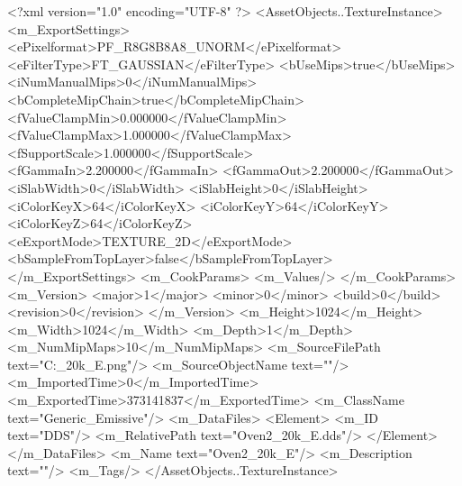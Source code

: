 <?xml version="1.0" encoding="UTF-8" ?>
<AssetObjects..TextureInstance>
	<m_ExportSettings>
		<ePixelformat>PF_R8G8B8A8_UNORM</ePixelformat>
		<eFilterType>FT_GAUSSIAN</eFilterType>
		<bUseMips>true</bUseMips>
		<iNumManualMips>0</iNumManualMips>
		<bCompleteMipChain>true</bCompleteMipChain>
		<fValueClampMin>0.000000</fValueClampMin>
		<fValueClampMax>1.000000</fValueClampMax>
		<fSupportScale>1.000000</fSupportScale>
		<fGammaIn>2.200000</fGammaIn>
		<fGammaOut>2.200000</fGammaOut>
		<iSlabWidth>0</iSlabWidth>
		<iSlabHeight>0</iSlabHeight>
		<iColorKeyX>64</iColorKeyX>
		<iColorKeyY>64</iColorKeyY>
		<iColorKeyZ>64</iColorKeyZ>
		<eExportMode>TEXTURE_2D</eExportMode>
		<bSampleFromTopLayer>false</bSampleFromTopLayer>
	</m_ExportSettings>
	<m_CookParams>
		<m_Values/>
	</m_CookParams>
	<m_Version>
		<major>1</major>
		<minor>0</minor>
		<build>0</build>
		<revision>0</revision>
	</m_Version>
	<m_Height>1024</m_Height>
	<m_Width>1024</m_Width>
	<m_Depth>1</m_Depth>
	<m_NumMipMaps>10</m_NumMipMaps>
	<m_SourceFilePath text="C:\Users\Shadow\Desktop\Prototypes{}_20k_E.png"/>
	<m_SourceObjectName text=""/>
	<m_ImportedTime>0</m_ImportedTime>
	<m_ExportedTime>373141837</m_ExportedTime>
	<m_ClassName text="Generic_Emissive"/>
	<m_DataFiles>
		<Element>
			<m_ID text="DDS"/>
			<m_RelativePath text="Oven2_20k_E.dds"/>
		</Element>
	</m_DataFiles>
	<m_Name text="Oven2_20k_E"/>
	<m_Description text=""/>
	<m_Tags/>
</AssetObjects..TextureInstance>


